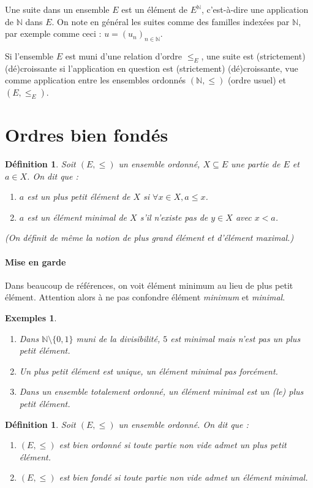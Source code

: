 \documentclass[12pt]{article}
\newtheorem{definition}[thm]{Définition}
\newtheorem{exemples}[thm]{Exemples}
\newcommand{\N}{\mathbb{N}}
\begin{document}
Une suite dans un ensemble $E$ est un élément de $E^\N$, c'est-à-dire une application de $\N$ dans $E$.
On note en général les suites comme des familles indexées par $\N$, par exemple comme ceci :  $u = (u_n)_{n\in\N}$.


Si l'ensemble $E$ est muni d'une relation d'ordre $\leq_E$, une suite est (strictement) (dé)croissante si l'application en question est (strictement) (dé)croissante, vue comme application entre les ensembles ordonnés $(\N,\leq)$ (ordre usuel) et $(E,\leq_E)$.



\section{Ordres bien fondés}
 
\begin{definition}
Soit $(E,\leq)$ un ensemble ordonné, $X\subseteq E$ une partie de $E$ et $a\in X$.
On dit que : 
\begin{enumerate}
\item $a$ est un plus petit élément de $X$ si $\forall x \in X, a\leq x$.
\item $a$ est un élément minimal de $X$ s'il n'existe pas de $y\in X$ avec $x < a$.
\end{enumerate}
(On définit de même la notion de plus grand élément et d'élément maximal.)
\end{definition}

\paragraph{Mise en garde} 
Dans beaucoup de références, on voit \og élément minimum\fg{} au lieu de \og plus petit élément\fg. Attention alors à ne pas confondre élément \emph{minimum} et \emph{minimal}.

\begin{exemples}
\begin{enumerate}
\item Dans $\N\setminus\{0,1\}$ muni de la divisibilité, $5$ est minimal mais n'est pas un plus petit élément.
\item Un plus petit élément est unique, un élément minimal pas forcément.
\item Dans un ensemble totalement ordonné, un élément minimal est un (le) plus petit élément.
\end{enumerate}
\end{exemples}
  
\begin{definition}
Soit $(E,\leq)$ un ensemble ordonné. On dit que : 
\begin{enumerate}
\item $(E,\leq)$ est \emph{bien ordonné} si toute partie non vide admet un plus petit élément.
\item $(E,\leq)$ est \emph{bien fondé} si toute partie non vide admet un élément minimal.
\end{enumerate}
\end{definition}
 
\end{document}
